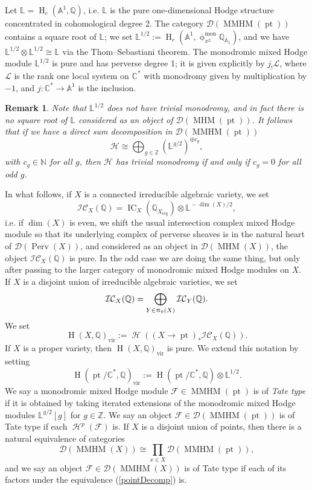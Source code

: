 \documentclass[a4paper,10pt]{amsart}
\newtheorem{remark}[theorem]{Remark}
\newcommand{\BC}{\pt/\mathbb{C}^*}
\newcommand{\LL}{\mathbb{L}}
\newcommand{\QQ}{\mathbb{Q}}
\newcommand{\ICS}{\mathcal{IC}}
\newcommand{\phim}[1]{\phi^{\mon}_{#1}}
\renewcommand{\pi}{\uppi\hspace{0.05em}}
\renewcommand{\phi}{\upphi}
\DeclareMathOperator{\mon}{mon}
\DeclareMathOperator{\MMHM}{MMHM}
\DeclareMathOperator{\Perv}{Perv}
\DeclareMathOperator{\MHM}{MHM}
\DeclareMathOperator{\IC}{IC}
\DeclareMathOperator{\pt}{pt}
\DeclareMathOperator{\vir}{vir}
\DeclareMathOperator{\Ho}{\mathcal{H}}
\DeclareMathOperator{\HO}{H}
\newcommand{\Dub}{\mathcal{D}}
\begin{document}
Let $\mathbb{L}=\HO_c(\mathbb{A}^1,\mathbb{Q})$, i.e. $\mathbb{L}$ is the pure one-dimensional Hodge structure concentrated in cohomological degree 2.  The category $\Dub(\MMHM(\pt))$ contains a square root of $\LL$; we set $\LL^{1/2}:=\HO_c(\mathbb{A}^1,\phim{x^2}\mathbb{Q}_{\mathbb{A}_1})$, and we have $\LL^{1/2}\otimes \LL^{1/2}\cong \LL$ via the Thom--Sebastiani theorem.  The monodromic mixed Hodge module $\LL^{1/2}$ is pure and has perverse degree 1; it is given explicitly by $j_!\mathcal{L}$, where $\mathcal{L}$ is the rank one local system on $\mathbb{C}^*$ with monodromy given by multiplication by $-1$, and $j\colon\mathbb{C}^*\rightarrow\mathbb{A}^1$ is the inclusion.  
\begin{remark}
\label{monRem}
Note that $\LL^{1/2}$ does not have trivial monodromy, and in fact there is no square root of $\LL$ considered as an object of $\Dub(\MHM(\pt))$.  It follows that if we have a direct sum decomposition in $\Dub(\MMHM(\pt))$
\[
\mathcal{H}\cong\bigoplus_{g\in\mathbb{Z}}\left(\mathbb{L}^{g/2}\right)^{\oplus c_g},
\]
with $c_g\in\mathbb{N}$ for all $g$, then $\mathcal{H}$ has trivial monodromy if and only if $c_g=0$ for all odd $g$.
\end{remark}
In what follows, if $X$ is a connected irreducible algebraic variety, we set 
\[
\ICS_X(\mathbb{Q})=\IC_X(\mathbb{Q}_{X_{\mathrm{reg}}})\otimes\LL^{{}-\dim(X)/2}, 
\]
i.e. if $\dim(X)$ is even, we shift the usual intersection complex mixed Hodge module so that its underlying complex of perverse sheaves is in the natural heart of $\Dub(\Perv(X))$, and considered as an object in $\Dub(\MHM(X))$, the object $\ICS_X(\mathbb{Q})$ is pure.  In the odd case we are doing the same thing, but only after passing to the larger category of monodromic mixed Hodge modules on $X$.  If $X$ is a disjoint union of irreducible algebraic varieties, we set
\[
\ICS_X(\mathbb{Q})=\bigoplus_{Y\in \pi_0(X)}\ICS_Y(\mathbb{Q}).
\]
We set 
\[
\HO(X,\mathbb{Q})_{\vir}:=\Ho((X\rightarrow \pt)_*\ICS_X(\mathbb{Q})).
\]
If $X$ is a proper variety, then $\HO(X,\QQ)_{\vir}$ is pure.  We extend this notation by setting 
\[
\HO(\BC,\QQ)_{\vir}:=\HO(\BC,\QQ)\otimes\LL^{1/2}.
\]
We say a monodromic mixed Hodge module $\mathcal{F}\in\MMHM(\pt)$ is of \textit{Tate type} if it is obtained by taking iterated extensions of the monodromic mixed Hodge modules $\LL^{g/2}[g]$ for $g\in\mathbb{Z}$.  We say an object $\mathcal{F}\in\Dub(\MMHM(\pt))$ is of Tate type if each $\Ho^p(\mathcal{F})$ is.  If $X$ is a disjoint union of points, then there is a natural equivalence of categories
\begin{equation}
\label{pointDecomp}
\Dub(\MMHM(X))\cong\prod_{x\in X}\Dub(\MMHM(\pt)),
\end{equation}
and we say an object $\mathcal{F}\in\Dub(\MMHM(X))$ is of Tate type if each of its factors under the equivalence (\ref{pointDecomp}) is.
\end{document}
